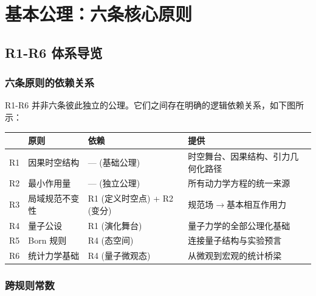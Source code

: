 \documentclass[11pt,a4paper,openany]{book}
\begin{document}
\tableofcontents

\mainmatter


\part{基本公理：六条核心原则}

\chapter*{R1-R6 体系导览}

\section*{六条原则的依赖关系}

R1-R6 并非六条彼此独立的公理。它们之间存在明确的逻辑依赖关系，如下图所示：

\begin{center}
\small
\begin{tabular}{p{0.4cm}p{2.8cm}p{5.5cm}p{5.5cm}}
\toprule
 & \textbf{原则} & \textbf{依赖} & \textbf{提供} \\
\midrule
R1 & 因果时空结构 & — (基础公理) & 时空舞台、因果结构、引力几何化路径 \\
R2 & 最小作用量 & — (独立公理) & 所有动力学方程的统一来源 \\
R3 & 局域规范不变性 & R1 (定义时空点) + R2 (变分) & 规范场$\to$基本相互作用力 \\
R4 & 量子公设 & R1 (演化舞台) & 量子力学的全部公理化基础 \\
R5 & Born 规则 & R4 (态空间) & 连接量子结构与实验预言 \\
R6 & 统计力学基础 & R4 (量子微观态) & 从微观到宏观的统计桥梁 \\
\bottomrule
\end{tabular}
\end{center}

\vspace{12pt}

\section*{跨规则常数}
\end{document}
